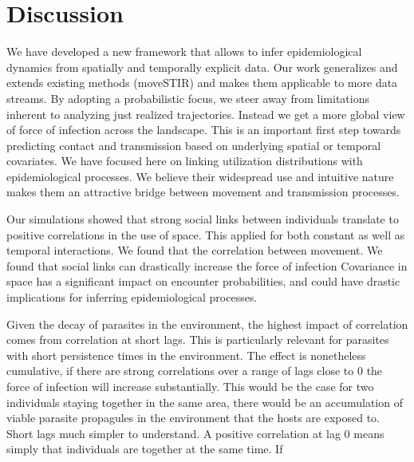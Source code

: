 \documentclass[letterpaper]{article}
\begin{document}
\section*{Discussion}
We have developed a new framework that allows to infer epidemiological dynamics from spatially and temporally explicit data. Our work generalizes and extends existing methods (moveSTIR) and makes them applicable to more data streams. 
By adopting a probabilistic focus, we steer away from limitations inherent to analyzing just realized trajectories. Instead we get a more global view of force of infection across the landscape. This is an important first step towards predicting contact and transmission based on underlying spatial or temporal covariates. %
We have focused here on linking utilization distributions with epidemiological processes. We believe their widespread use and intuitive nature makes them an attractive bridge between movement and transmission processes. 

% 
Our simulations showed that strong social links between individuals translate to positive correlations in the use of space. This applied for both constant as well as temporal interactions. 
We found that the correlation between movement. We found that  social links can drastically increase the force of infection
Covariance in space has a significant impact on encounter probabilities, and could have drastic implications for inferring epidemiological processes. 


Given the decay of parasites in the environment, the highest impact of correlation comes from correlation at short lags. %
This is particularly relevant for parasites with short persistence times in the environment. %
The effect is nonetheless cumulative, if there are strong correlations over a range of lags close to 0 the force of infection will increase substantially. This would be the case for two individuals staying together in the same area, there would be an accumulation of viable parasite propagules in the environment that the hosts are exposed to. 
Short lags much simpler to understand. A positive correlation at lag 0 means simply that individuals are together at the same time. 
If 
\end{document}

